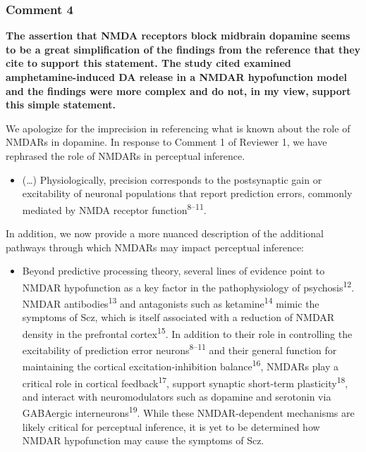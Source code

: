 \documentclass[
]{article}
\providecommand{\tightlist}{%
  \setlength{\itemsep}{0pt}\setlength{\parskip}{0pt}}
\begin{document}
\subsubsection{Comment 4}\label{comment-4-1}

\textbf{The assertion that NMDA receptors block midbrain dopamine seems
to be a great simplification of the findings from the reference that
they cite to support this statement. The study cited examined
amphetamine-induced DA release in a NMDAR hypofunction model and the
findings were more complex and do not, in my view, support this simple
statement.}

We apologize for the imprecision in referencing what is known about the
role of NMDARs in dopamine. In response to Comment 1 of Reviewer 1, we
have rephrased the role of NMDARs in perceptual inference.

\begin{itemize}
\tightlist
\item
  (\ldots) Physiologically, precision corresponds to the postsynaptic
  gain or excitability of neuronal populations that report prediction
  errors, commonly mediated by NMDA receptor
  function\textsuperscript{8--11}.
\end{itemize}

In addition, we now provide a more nuanced description of the additional
pathways through which NMDARs may impact perceptual inference:

\begin{itemize}
\tightlist
\item
  Beyond predictive processing theory, several lines of evidence point
  to NMDAR hypofunction as a key factor in the pathophysiology of
  psychosis\textsuperscript{12}. NMDAR antibodies\textsuperscript{13}
  and antagonists such as ketamine\textsuperscript{14} mimic the
  symptoms of Scz, which is itself associated with a reduction of NMDAR
  density in the prefrontal cortex\textsuperscript{15}. In addition to
  their role in controlling the excitability of prediction error
  neurons\textsuperscript{8--11} and their general function for
  maintaining the cortical excitation-inhibition
  balance\textsuperscript{16}, NMDARs play a critical role in cortical
  feedback\textsuperscript{17}, support synaptic short-term
  plasticity\textsuperscript{18}, and interact with neuromodulators such
  as dopamine and serotonin via GABAergic
  interneurons\textsuperscript{19}. While these NMDAR-dependent
  mechanisms are likely critical for perceptual inference, it is yet to
  be determined how NMDAR hypofunction may cause the symptoms of Scz.
\end{itemize}
\end{document}
